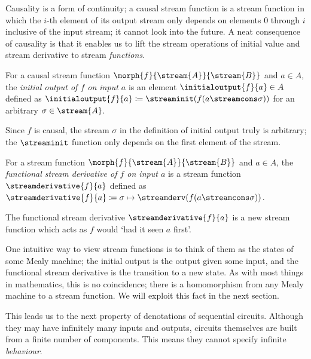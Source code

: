 \documentclass{lmcs}
\begin{document}
Causality is a form of continuity; a causal stream function is a stream function
in which the \(i\)-th element of its output stream only depends on elements
\(0\) through \(i\) inclusive of the input stream; it cannot look into the
future.
A neat consequence of causality is that it enables us to lift the stream
operations of initial value and stream derivative to stream \emph{functions}.

\begin{defi}
    For a causal stream function \(\morph{f}{\stream{A}}{\stream{B}}\) and
    \(a \in A\), the \emph{initial output of \(f\) on input \(a\)} is an element
    \(\initialoutput{f}{a} \in A\) defined as
    \(\initialoutput{f}{a} \coloneqq \streaminit(f(a \streamcons \sigma))\) for
    an arbitrary \(\sigma \in \stream{A}\).
\end{defi}

Since \(f\) is causal, the stream \(\sigma\) in the definition of initial
output truly is arbitrary; the \(\streaminit\) function only depends on the
first element of the stream.

\begin{defi}
    For a stream function \(\morph{f}{\stream{A}}{\stream{B}}\) and
    \(a \in A\), the
    \emph{functional stream derivative of \(f\) on input \(a\)} is a stream
    function \(\streamderivative{f}{a}\) defined as \(
    \streamderivative{f}{a}
    \coloneqq
    \sigma \mapsto \streamderv(f(a \streamcons \sigma))
    \).
\end{defi}

The functional stream derivative \(\streamderivative{f}{a}\) is a new stream
function which acts as \(f\) would `had it seen \(a\) first'.

\begin{rem}
    One intuitive way to view stream functions is to think of them as the states
    of some Mealy machine; the initial output is the output given some input,
    and the functional stream derivative is the transition to a new state.
    As with most things in mathematics, this is no coincidence; there is a
    homomorphism from any Mealy machine to a stream function.
    We will exploit this fact in the next section.
\end{rem}

This leads us to the next property of denotations of sequential circuits.
Although they may have infinitely many inputs and outputs, circuits themselves
are built from a finite number of components.
This means they cannot specify infinite \emph{behaviour}.
\end{document}
